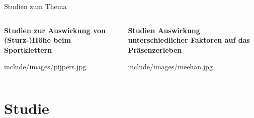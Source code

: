 \begin{frame}{Studien zum Thema}
\begin{columns}
	\begin{column}{0.5\textwidth}
		\textbf{Studien zur Auswirkung von (Sturz-)Höhe beim Sportklettern}
		\autocites{Hardy2007}{Pijpers2006,Pijpers2005,Pijpers2003}
		\begin{center}
			\begin{overpic}[height=0.555\textheight]{include/images/pijpers.jpg}
			\end{overpic}
		\end{center}
	\end{column}
	\begin{column}{0.5\textwidth}
		\textbf{Studien Auswirkung unterschiedlicher Faktoren auf das Präsenzerleben}\\
		\autocite{Meehan2002,Meehan2001}
		\begin{center}
			\begin{overpic}[height=0.53\textheight]{include/images/meehan.jpg}
			\end{overpic}
		\end{center}
		\vfill
	\end{column}
\end{columns}
\end{frame}

\section{Studie}

